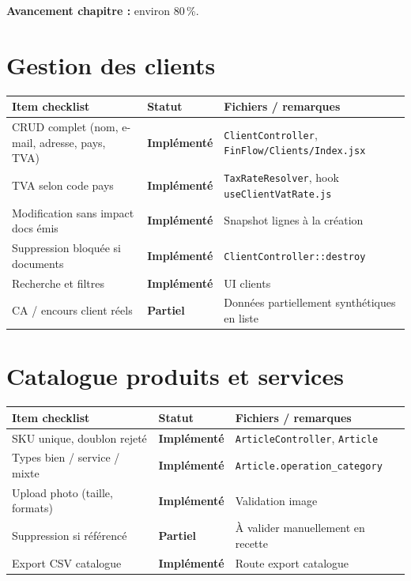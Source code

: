 \documentclass[11pt,a4paper]{report}
\newcommand{\route}[1]{\texttt{\small #1}}
\newcommand{\ctrl}[1]{\texttt{\small #1}}
\newcommand{\svc}[1]{\texttt{\small #1}}
\newcommand{\model}[1]{\texttt{\small #1}}
\newcommand{\statimpl}{\textcolor{statok}{\textbf{Implémenté}}}
\newcommand{\statpart}{\textcolor{statpartial}{\textbf{Partiel}}}
\begin{document}
\textbf{Avancement chapitre :} environ 80\,\%.

\section{Gestion des clients}

\begin{longtable}{@{}L{7.8cm}C{2.4cm}L{4.4cm}@{}}
    \toprule
    \textbf{Item checklist} & \textbf{Statut} & \textbf{Fichiers / remarques} \\
    \midrule
    \endhead
    CRUD complet (nom, e-mail, adresse, pays, TVA) & \statimpl & \ctrl{ClientController}, \route{FinFlow/Clients/Index.jsx} \\
    TVA selon code pays & \statimpl & \svc{TaxRateResolver}, hook \route{useClientVatRate.js} \\
    Modification sans impact docs émis & \statimpl & Snapshot lignes à la création \\
    Suppression bloquée si documents & \statimpl & \ctrl{ClientController::destroy} \\
    Recherche et filtres & \statimpl & UI clients \\
    CA / encours client réels & \statpart & Données partiellement synthétiques en liste \\
    \bottomrule
\end{longtable}

\section{Catalogue produits et services}

\begin{longtable}{@{}L{7.8cm}C{2.4cm}L{4.4cm}@{}}
    \toprule
    \textbf{Item checklist} & \textbf{Statut} & \textbf{Fichiers / remarques} \\
    \midrule
    \endhead
    SKU unique, doublon rejeté & \statimpl & \ctrl{ArticleController}, \model{Article} \\
    Types bien / service / mixte & \statimpl & \model{Article.operation\_category} \\
    Upload photo (taille, formats) & \statimpl & Validation image \\
    Suppression si référencé & \statpart & À valider manuellement en recette \\
    Export CSV catalogue & \statimpl & Route export catalogue \\
    \bottomrule
\end{longtable}
\end{document}
